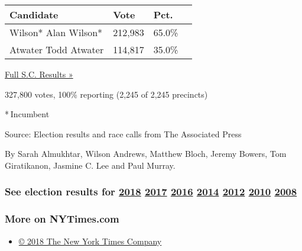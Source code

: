 \begin{longtable}[]{@{}llll@{}}
\toprule
Candidate & Vote & Pct. &\tabularnewline
\midrule
\endhead
 Wilson* Alan Wilson* & 212,983 & 65.0\% &\tabularnewline
 Atwater Todd Atwater & 114,817 & 35.0\% &\tabularnewline
\bottomrule
\end{longtable}

\href{https://www.nytimes3xbfgragh.onion/elections/results/south-carolina}{Full
S.C. Results »}

327,800 votes, 100\% reporting (2,245 of 2,245 precincts)

* Incumbent

Source: Election results and race calls from The Associated Press

By Sarah Almukhtar, Wilson Andrews, Matthew Bloch, Jeremy Bowers, Tom
Giratikanon, Jasmine C. Lee and Paul Murray.

\hypertarget{see-election-results-for-2018-2017-2016-2014-2012-2010-2008}{%
\subsubsection{\texorpdfstring{See election results for
\href{https://www.nytimes3xbfgragh.onion/interactive/2018/us/elections/calendar-primary-results.html}{2018}
\href{https://www.nytimes3xbfgragh.onion/interactive/2017/us/elections/election-calendar.html}{2017}
\href{https://www.nytimes3xbfgragh.onion/elections/results/president}{2016}
\href{https://www.nytimes3xbfgragh.onion/elections/2014/results/senate}{2014}
\href{https://www.nytimes3xbfgragh.onion/elections/2012/results/president.html}{2012}
\href{https://www.nytimes3xbfgragh.onion/elections/2010/results/senate.html}{2010}
\href{https://www.nytimes3xbfgragh.onion/elections/2008/results/president/map.html}{2008}}{See election results for 2018 2017 2016 2014 2012 2010 2008}}\label{see-election-results-for-2018-2017-2016-2014-2012-2010-2008}}

\hypertarget{more-on-nytimescom}{%
\subsubsection{More on NYTimes.com}\label{more-on-nytimescom}}

\begin{itemize}
\tightlist
\item
  \href{http://www.nytco.com}{© 2018 The New York Times Company}
\end{itemize}

